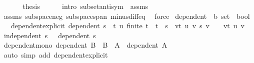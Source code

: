 \begin{isabellebody}
\ \ \isamarkupfalse%
\isanewline
\ \ \isamarkupfalse%
\ {\isacharquery}{\kern0pt}thesis\isanewline
\ \ \ \ \isamarkupfalse%
\ {\isacharparenleft}{\kern0pt}intro\ subset{\isacharunderscore}{\kern0pt}antisym\ {\isacharasterisk}{\kern0pt}\ assms{\isacharparenright}{\kern0pt}\isanewline
\ \ \ \ \isamarkupfalse%
\ assms\ subspace{\isacharunderscore}{\kern0pt}neg\ subspace{\isacharunderscore}{\kern0pt}span\ minus{\isacharunderscore}{\kern0pt}diff{\isacharunderscore}{\kern0pt}eq\ \isamarkupfalse%
\ force\isanewline
{}\isamarkupfalse%
%
\endisatagproof
{\isafoldproof}%
%
\isadelimproof
%
\endisadelimproof
%
\isadelimdocument
%
\endisadelimdocument
%
\isatagdocument
%
\isamarkuptrue%
%
\endisatagdocument
{\isafolddocument}%
%
\isadelimdocument
%
\endisadelimdocument
{}\isamarkupfalse%
\ dependent\ {\isacharcolon}{\kern0pt}{\isacharcolon}{\kern0pt}\ {\isachardoublequoteopen}{\isacharprime}{\kern0pt}b\ set\ {\isasymRightarrow}\ bool{\isachardoublequoteclose}\isanewline
\ \ \ dependent{\isacharunderscore}{\kern0pt}explicit{\isacharcolon}{\kern0pt}\ {\isachardoublequoteopen}dependent\ s\ {\isasymlongleftrightarrow}\ {\isacharparenleft}{\kern0pt}{\isasymexists}t\ u{\isachardot}{\kern0pt}\ finite\ t\ {\isasymand}\ t\ {\isasymsubseteq}\ s\ {\isasymand}\ {\isacharparenleft}{\kern0pt}{\isasymSum}v{\isasymin}t{\isachardot}{\kern0pt}\ u\ v\ {\isacharasterisk}{\kern0pt}s\ v{\isacharparenright}{\kern0pt}\ {\isacharequal}{\kern0pt}\ {}\ {\isasymand}\ {\isacharparenleft}{\kern0pt}{\isasymexists}v{\isasymin}t{\isachardot}{\kern0pt}\ u\ v\ {\isasymnoteq}\ {}{\isacharparenright}{\kern0pt}{\isacharparenright}{\kern0pt}{\isachardoublequoteclose}\isanewline
\isanewline
{}\isamarkupfalse%
\ {\isachardoublequoteopen}independent\ s\ {\isasymequiv}\ {\isasymnot}\ dependent\ s{\isachardoublequoteclose}\isanewline
\isanewline
{}\isamarkupfalse%
\ dependent{\isacharunderscore}{\kern0pt}mono{\isacharcolon}{\kern0pt}\ {\isachardoublequoteopen}dependent\ B\ {\isasymLongrightarrow}\ B\ {\isasymsubseteq}\ A\ {\isasymLongrightarrow}\ dependent\ A{\isachardoublequoteclose}\isanewline
%
\isadelimproof
\ \ %
\endisadelimproof
%
\isatagproof
{}\isamarkupfalse%
\ {\isacharparenleft}{\kern0pt}auto\ simp\ add{\isacharcolon}{\kern0pt}\ dependent{\isacharunderscore}{\kern0pt}explicit{\isacharparenright}{\kern0pt}%
\endisatagproof
{\isafoldproof}%

\end{isabellebody}

